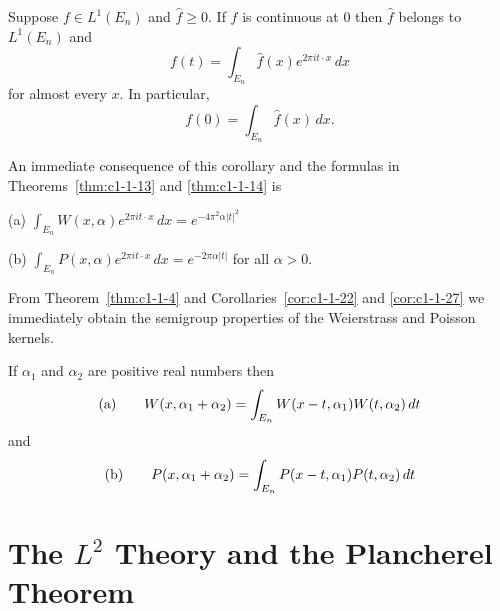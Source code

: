 \begin{corollary}\label{cor:c1-1-26}
Suppose $f \in L^{1}(E_{n})$ and $\hat{f} \geq 0$. If $f$ is continuous at $0$
then $\hat{f}$ belongs to $L^{1}(E_{n})$ and
\[
f(t)=\int_{E_{n}}\hat{f}(x)e^{2\pi i t\cdot x}\,dx
\]
for almost every $x$. In particular,
\[
f(0)=\int_{E_{n}}\hat{f}(x)\,dx.
\]
\end{corollary}

An immediate consequence of this corollary and the formulas in
Theorems~\ref{thm:c1-1-13} and \ref{thm:c1-1-14} is

\begin{corollary}\label{cor:c1-1-27}
\textup{(a)} $\int_{E_{n}} W(x, \alpha) e^{2\pi i t \cdot x} \, dx = e^{-4\pi^{2} \alpha |t|^{2}}$

\textup{(b)} $\int_{E_{n}} P(x, \alpha) e^{2\pi i t \cdot x} \, dx = e^{-2\pi\alpha|t|}$
for all $\alpha > 0$.
\end{corollary}

From Theorem~\ref{thm:c1-1-4} and Corollaries~\ref{cor:c1-1-22}
and \ref{cor:c1-1-27} we immediately obtain the semigroup properties of the
Weierstrass and Poisson kernels.

\begin{corollary}\label{cor:c1-1-28}
If $\alpha_{1}$ and $\alpha_{2}$ are positive real numbers then
\[
\textup{(a)}\qquad W(x,\alpha_{1}+\alpha_{2})=\int_{E_{n}}W(x-t,\alpha_{1})W(t,\alpha_{2})\,dt
\]
and
\[
\textup{(b)}\qquad P(x,\alpha_{1}+\alpha_{2})=\int_{E_{n}}P(x-t,\alpha_{1})P(t,\alpha_{2})\,dt
\]
\end{corollary}

\section{The \texorpdfstring{$L^{2}$}{L2} Theory and the Plancherel Theorem}

